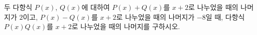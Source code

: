 두 다항식 $P(x)$, $Q(x)$에 대하여 $P(x)+Q(x)$를 $x+2$로 나누었을 때의 나머지가 $2$이고, $P(x)-Q(x)$를 $x+2$로 나누었을 때의 나머지가 $-8$일 때, 다항식 $P(x)Q(x)$를 $x+2$로 나누었을 때의 나머지를 구하시오.

